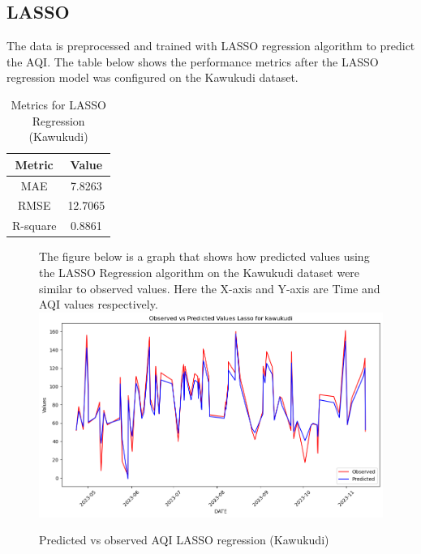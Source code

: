 \documentclass{book}
\numberwithin{equation}{section}
\numberwithin{figure}{section}
\begin{document}
\subsection{LASSO}
The data is preprocessed and trained with LASSO regression algorithm to predict the AQI. The table below shows the performance metrics after the LASSO regression model was configured on the Kawukudi dataset.\\
\begin{table}[H]
    \centering
    \begin{tabular}{|c|c|}
        \hline
        \textbf{Metric} & \textbf{Value} \\
        \hline
        MAE & 7.8263 \\
        \hline
        RMSE & 12.7065 \\
        \hline
        R-square & 0.8861 \\
        \hline
    \end{tabular}
    \caption{Metrics for LASSO Regression (Kawukudi)}
    \label{tab: LASSO metrics(Kawukudi)}
\end{table}
\begin{figure}[H]
 \begin{minipage}{\linewidth}
        The figure below is a graph that shows how predicted values using the LASSO Regression algorithm on the Kawukudi dataset were similar to observed values. Here the X-axis and Y-axis are Time and AQI values respectively.
        \vspace{0.5em} 
        \includegraphics[width=\linewidth]{kawukudi LASSO.png}
       
        \caption{ Predicted vs observed AQI LASSO regression (Kawukudi)}
        \label{fig: LASSO predicted vs observed AQI(Kawukudi)}
    \end{minipage}
\end{figure}
\end{document}
